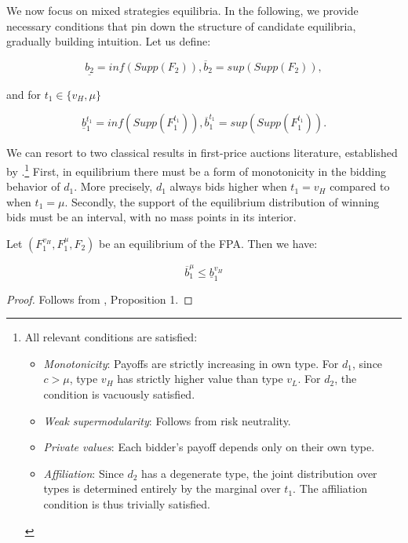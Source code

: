 \noindent We now focus on mixed strategies equilibria. In the following, we provide necessary conditions that pin down the structure of candidate equilibria, gradually building intuition. Let us define:

\[
\underline{b_2} = inf\left(Supp\left(F_2\right)\right),  \overline b_2 = sup\left(Supp\left(F_2\right)\right),
\]

\noindent and for $ t_1 \in \{ v_H, \mu \} $

\[
\underline{b}_1^{t_1} = inf\left(Supp\left(F_1^{t_1}\right)\right),  \overline{b}_1^{t_1} = sup\left(Supp\left(F_1^{t_1}\right)\right).
\]

\noindent We can resort to two classical results in first-price auctions literature, established by \textcite{maskinEquilibriumSealedHigh2000}.\footnote{\noindent All relevant conditions are satisfied:
\begin{itemize}
    \item[-] \textit{Monotonicity}: Payoffs are strictly increasing in own type. For $ d_1 $, since $ c > \mu $, type $ v_H $ has strictly higher value than type $ v_L $. For $ d_2 $, the condition is vacuously satisfied.
    \item[-] \textit{Weak supermodularity}: Follows from risk neutrality.
    \item[-] \textit{Private values}: Each bidder's payoff depends only on their own type.
    \item[-] \textit{Affiliation}: Since $ d_2 $ has a degenerate type, the joint distribution over types is determined entirely by the marginal over $ t_1 $. The affiliation condition is thus trivially satisfied.
\end{itemize}
} First, in equilibrium there must be a form of monotonicity in the bidding behavior of $ d_1 $. More precisely, $ d_1 $ always bids higher when $ t_1 = v_H $ compared to when $ t_1 = \mu $. Secondly, the support of the equilibrium distribution of winning bids must be an interval, with no mass points in its interior.

\begin{lem}\label{lem:monotonicity}
Let $ \left(F_1^{v_H}, F_1^{\mu}, F_2 \right) $ be an equilibrium of the FPA. Then we have:

\begin{equation*}
\overline{b}_1^{\mu} \leq \underline{b}_1^{v_H}
\end{equation*}
\end{lem}
\begin{proof}
    Follows from \textcite{maskinEquilibriumSealedHigh2000}, Proposition 1.
\end{proof}

